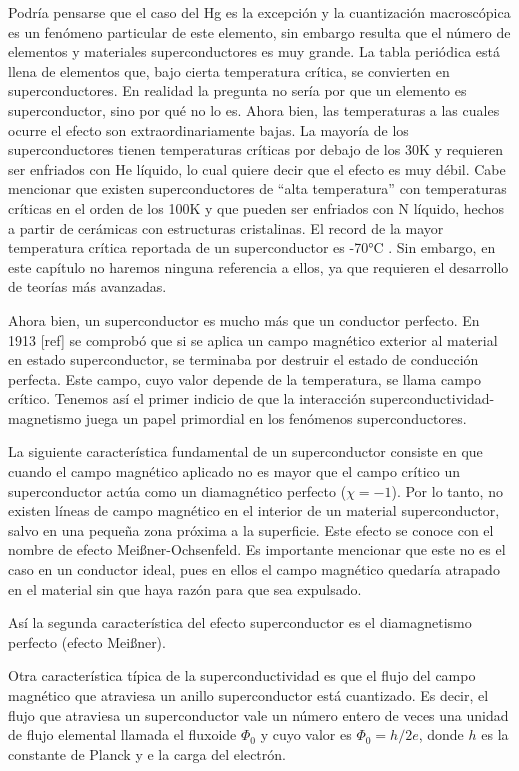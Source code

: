 Podría pensarse que el caso del Hg es la excepción y la cuantización macroscópica es un fenómeno particular de este elemento, sin embargo resulta que el número de elementos y materiales superconductores es muy grande. La tabla periódica está llena de elementos que, bajo cierta temperatura crítica, se convierten en superconductores. En realidad la pregunta no sería por que un elemento es superconductor, sino por qué no lo es. Ahora bien, las temperaturas a las cuales ocurre el efecto son extraordinariamente bajas. La mayoría de los superconductores tienen temperaturas críticas por debajo de los 30K y requieren ser enfriados con He líquido, lo cual quiere decir que el efecto es muy débil. Cabe mencionar que existen superconductores de ``alta temperatura'' con temperaturas críticas en el orden de los 100K y que pueden ser enfriados con N líquido, hechos a partir de cerámicas con estructuras cristalinas. El record de la mayor temperatura crítica reportada de un superconductor es -70°C \cite{drozdov}. Sin embargo, en este capítulo no haremos ninguna referencia a ellos, ya que requieren el desarrollo de teorías más avanzadas.

Ahora bien, un superconductor es mucho más que un conductor perfecto. En 1913 [ref] se comprobó que si se aplica un campo magnético exterior al material en estado superconductor, se terminaba por destruir el estado de conducción perfecta. Este campo, cuyo valor depende de la temperatura, se llama campo crítico. Tenemos así el primer indicio de que la interacción superconductividad-magnetismo juega un papel primordial en los fenómenos superconductores.

La siguiente característica fundamental de un superconductor consiste en que cuando el campo magnético aplicado no es mayor que el campo  crítico un superconductor actúa como un diamagnético perfecto ($\chi = -1$). Por lo tanto, no existen líneas de campo magnético en el interior de un material superconductor, salvo en una pequeña zona próxima a la superficie. Este efecto se conoce con el nombre de efecto Meißner-Ochsenfeld. Es importante mencionar que este no es el caso en un conductor ideal, pues en ellos el campo magnético quedaría atrapado en el material sin que haya razón para que sea expulsado.

Así la segunda característica del efecto superconductor es el diamagnetismo perfecto (efecto Meißner).

Otra característica típica de la superconductividad es que el flujo del campo magnético que atraviesa un anillo superconductor está cuantizado. Es decir, el flujo que atraviesa un superconductor vale un número entero de veces una unidad de flujo elemental llamada el fluxoide $\Phi_0$ y cuyo valor es $\Phi_0 = h /2 e$, donde $h$ es la constante de Planck y e la carga del electrón.

